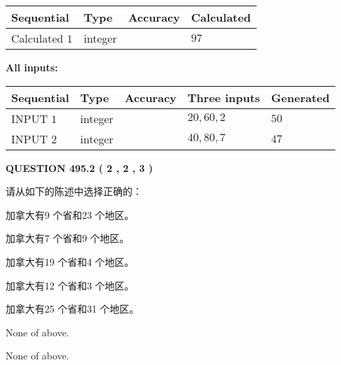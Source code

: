 \documentclass{ctexart}
\begin{document}
  
\noindent\begin{tabular}{|l|l|l|l|}
\hline
 Sequential & Type & Accuracy & Calculated \\ 
\hline
 
 
  Calculated $  1 $ & integer &  & 
  $ 97 $ 
 \\  \hline  
 \end{tabular}
   
   
   
   
\noindent\vspace{0.1in}\hspace{-0.08in} {\textbf{\Large{All inputs: }}}
   
   
  
  
\noindent\begin{tabular}{|l|l|l|l|l|}
\hline
 Sequential & Type & Accuracy & Three inputs & Generated \\ 
\hline
 
 
  INPUT $  1 $ & integer &  & $
 20
 , 
 60
 , 
 2
 $ & $ 50 $ 
 \\  \hline  
 
 
  INPUT $  2 $ & integer &  & $
 40
 , 
 80
 , 
 7
 $ & $ 47 $ 
 \\  \hline  
 \end{tabular}
   
   
  
\vspace{0.2in}
  
{\textbf{\Large{QUESTION
495.2 
 ( 2 , 2 , 3 )
}}}
  
  
请从如下的陈述中选择正确的：
 
 
加拿大有9 个省和23 个地区。
 
 
加拿大有7 个省和9 个地区。
 
 
加拿大有19 个省和4 个地区。
 
 
加拿大有12 个省和3 个地区。
 
 
加拿大有25 个省和31 个地区。
 
 
 None of above.
 
 
\noindent{}
 
 
 None of above.
 
 
\noindent{}
 
\end{document}

